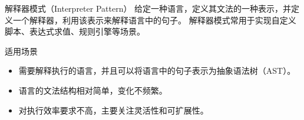 \documentclass[UTF8,aspectratio=169]{beamer}
\begin{document}
\begin{frame}{解释器模式（Interpreter Pattern）}
    给定一种语言，定义其文法的一种表示，并定义一个解释器，利用该表示来解释语言中的句子。
    解释器模式常用于实现自定义脚本、表达式求值、规则引擎等场景。
    \begin{ytublock}{适用场景}
        \begin{itemize}
            \item 需要解释执行的语言，并且可以将语言中的句子表示为抽象语法树（AST）。
            \item 语言的文法结构相对简单，变化不频繁。
            \item 对执行效率要求不高，主要关注灵活性和可扩展性。
        \end{itemize}
    \end{ytublock}
\end{frame}
\end{document}
